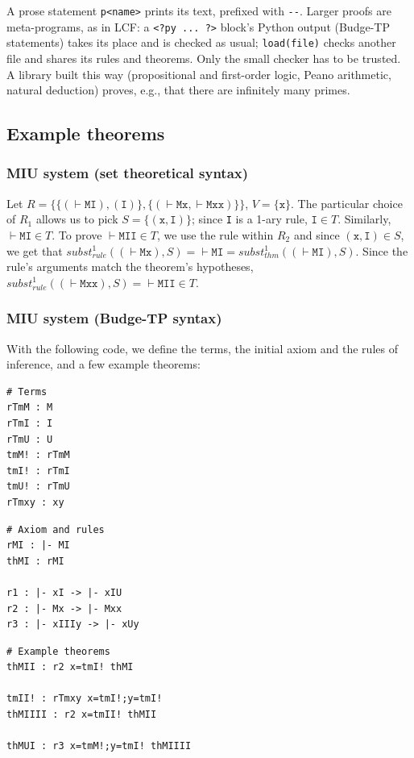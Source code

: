 \documentclass{article}
\begin{document}
A prose statement \texttt{p<name>} prints its text, prefixed with \texttt{-{}-}. Larger proofs are meta-programs, as in LCF\cite{b8}: a \texttt{<?py ... ?>} block's Python output (Budge-TP statements) takes its place and is checked as usual; \texttt{load(file)} checks another file and shares its rules and theorems. Only the small checker has to be trusted. A library built this way (propositional and first-order logic, Peano arithmetic, natural deduction) proves, e.g., that there are infinitely many primes.

\subsection{Example theorems}

\subsubsection{MIU system\cite{b1} (set theoretical syntax)}

Let $R = \{ \{ (\vdash\texttt{MI}), (\texttt{I}) \}, \{ (\vdash\texttt{Mx}, \vdash\texttt{Mxx}) \} \}$, $V = \{ \texttt{x} \}$. The particular choice of $R_1$ allows us to pick $S = \{ (\texttt{x}, \texttt{I}) \}$; since \texttt{I} is a 1-ary rule, $\texttt{I} \in T$. Similarly, $\vdash \texttt{MI} \in T$. To prove $\vdash\texttt{MII} \in T$, we use the rule within $R_2$ and since $(\texttt{x}, \texttt{I}) \in S$, we get that $subst_{rule}^1((\vdash\texttt{Mx}), S) = \vdash\texttt{MI} = subst_{thm}^1((\vdash\texttt{MI}), S)$. Since the rule's arguments match the theorem's hypotheses, $subst_{rule}^1((\vdash\texttt{Mxx}), S) = \vdash\texttt{MII} \in T$.

\subsubsection{MIU system (Budge-TP syntax)}

With the following code, we define the terms, the initial axiom and the rules of inference, and a few example theorems:

\begin{minipage}{0.22\textwidth}
\begin{verbatim}
# Terms
rTmM : M
rTmI : I
rTmU : U
tmM! : rTmM
tmI! : rTmI
tmU! : rTmU
rTmxy : xy
\end{verbatim}
\end{minipage}
\begin{minipage}{0.34\textwidth}
\begin{verbatim}
# Axiom and rules
rMI : |- MI
thMI : rMI

r1 : |- xI -> |- xIU
r2 : |- Mx -> |- Mxx
r3 : |- xIIIy -> |- xUy
\end{verbatim}
\end{minipage}
\begin{minipage}{0.42\textwidth}
\begin{verbatim}
# Example theorems
thMII : r2 x=tmI! thMI

tmII! : rTmxy x=tmI!;y=tmI!
thMIIII : r2 x=tmII! thMII

thMUI : r3 x=tmM!;y=tmI! thMIIII
\end{verbatim}
\end{minipage}
\end{document}
